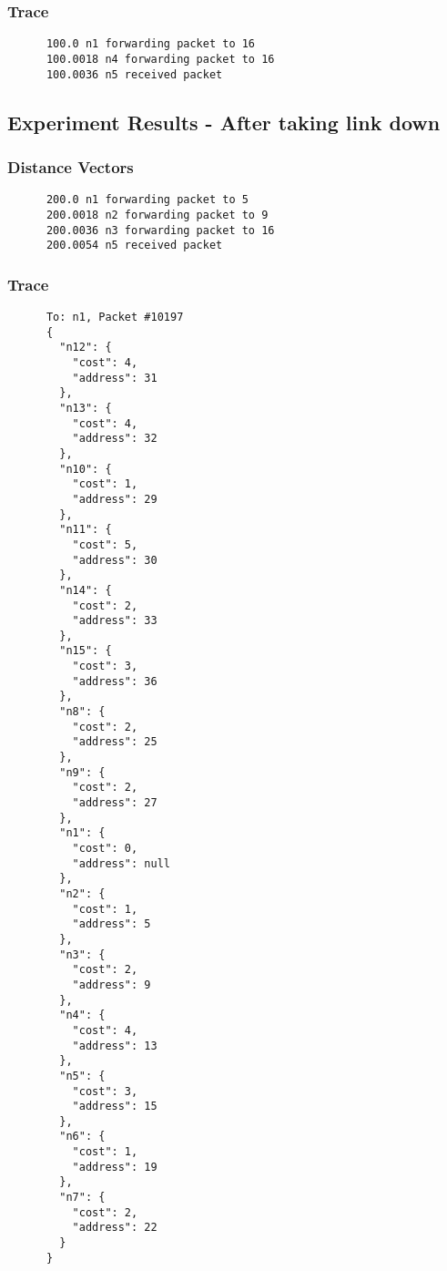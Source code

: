 \documentclass[fleqn,11pt]{article}
\begin{document}
  \subsubsection{Trace}
    \begin{verbatim}
      100.0 n1 forwarding packet to 16
      100.0018 n4 forwarding packet to 16
      100.0036 n5 received packet
    \end{verbatim}

  \subsection{Experiment Results - After taking link down}
  \subsubsection{Distance Vectors}
    \begin{verbatim}
      200.0 n1 forwarding packet to 5
      200.0018 n2 forwarding packet to 9
      200.0036 n3 forwarding packet to 16
      200.0054 n5 received packet
    \end{verbatim}
  \subsubsection{Trace}
    \begin{verbatim}
      To: n1, Packet #10197
      {
        "n12": {
          "cost": 4,
          "address": 31
        },
        "n13": {
          "cost": 4,
          "address": 32
        },
        "n10": {
          "cost": 1,
          "address": 29
        },
        "n11": {
          "cost": 5,
          "address": 30
        },
        "n14": {
          "cost": 2,
          "address": 33
        },
        "n15": {
          "cost": 3,
          "address": 36
        },
        "n8": {
          "cost": 2,
          "address": 25
        },
        "n9": {
          "cost": 2,
          "address": 27
        },
        "n1": {
          "cost": 0,
          "address": null
        },
        "n2": {
          "cost": 1,
          "address": 5
        },
        "n3": {
          "cost": 2,
          "address": 9
        },
        "n4": {
          "cost": 4,
          "address": 13
        },
        "n5": {
          "cost": 3,
          "address": 15
        },
        "n6": {
          "cost": 1,
          "address": 19
        },
        "n7": {
          "cost": 2,
          "address": 22
        }
      }
    \end{verbatim}
\end{document}
